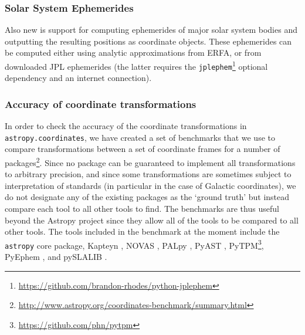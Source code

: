 \documentclass[modern]{aastex61}
\newcommand{\package}[1]{\texttt{#1}\xspace}
\newcommand{\astropy}{Astropy\xspace}
\newcommand{\astropypkg}{\package{astropy}}
\newcommand{\inlinecomment}[2]{\todo[inline]{#1: #2}\xspace}
\begin{document}


\subsubsection{Solar System Ephemerides}
    Also new is support for computing ephemerides of major solar system bodies
    and outputting the resulting positions as coordinate objects.
    These ephemerides can be computed either using analytic approximations from
    ERFA, or from downloaded JPL ephemerides (the latter requires the
    \package{jplephem}\footnote{\url{https://github.com/brandon-rhodes/python-jplephem}}
    optional dependency and an internet connection).


\subsubsection{Accuracy of coordinate transformations}

In order to check the accuracy of the coordinate transformations in \package{astropy.coordinates}, we have created a set of benchmarks that we use to compare transformations between a set of coordinate frames for a number of packages\footnote{\url{http://www.astropy.org/coordinates-benchmark/summary.html}}. Since
no package can be guaranteed to implement all transformations to arbitrary precision, and since some transformations are sometimes subject to interpretation of standards (in particular in the case of Galactic coordinates), we do not designate any of the existing packages as the `ground truth' but instead compare each tool to all other tools to find. The benchmarks are thus useful beyond the \astropy project since they allow all of the tools to be compared to all other tools. The tools included in the benchmark at the moment include the \astropypkg core package, Kapteyn \citep{kapteyn}, NOVAS \citep{novas}, PALpy \citep{pal}, PyAST \citep[a wrapper for AST, described in][]{ast}, PyTPM\footnote{\url{https://github.com/phn/pytpm}}, PyEphem \citep{pyephem}, and pySLALIB \citep[a Python wrapper for SLALIB, described in][]{slalib}.
\end{document}
